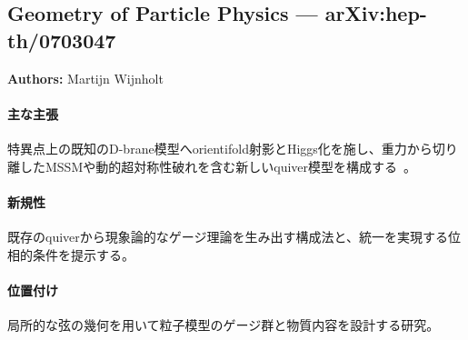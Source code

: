 \subsection{Geometry of Particle Physics --- arXiv:hep-th/0703047}

\textbf{Authors:} Martijn Wijnholt

\paragraph{主な主張}
特異点上の既知のD-brane模型へorientifold射影とHiggs化を施し、重力から切り離したMSSMや動的超対称性破れを含む新しいquiver模型を構成する~\cite{Wijnholt:2007vn}。

\paragraph{新規性}
既存のquiverから現象論的なゲージ理論を生み出す構成法と、統一を実現する位相的条件を提示する。

\paragraph{位置付け}
局所的な弦の幾何を用いて粒子模型のゲージ群と物質内容を設計する研究。
